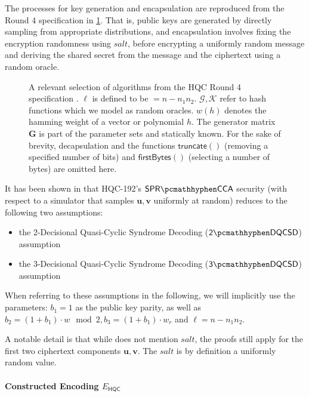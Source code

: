 The processes for key generation and encapsulation are reproduced from the Round 4 specification \cite{NISTPQC-R4:HQC22} in \cref{fig:hqc-spec}. That is, public keys are generated by directly sampling from appropriate distributions, and encapsulation involves fixing the encryption randomness using $\mathit{salt}$, before encrypting a uniformly random message and deriving the shared secret from the message and the ciphertext using a random oracle.

\begin{figure}
    
    \caption[
        A selection of algorithms from the HQC Round 4 specification.
    ]{
        A relevant selection of algorithms from the HQC Round 4 specification \cite{NISTPQC-R4:HQC22}. $\ell$ is defined to be $=n-n_1n_2$. $\mathcal G, \mathcal K$ refer to hash functions which we model as random oracles. $w(h)$ denotes the hamming weight of a vector or polynomial $h$. The generator matrix $\mathbf G$ is part of the parameter sets and statically known.
        For the sake of brevity, decapsulation and the functions $\mathsf{truncate}()$ (removing a specified number of bits) and $\mathsf{firstBytes}()$ (selecting a number of bytes) are omitted here.}
    \label{fig:hqc-spec}
\end{figure}

It has been shown in \cite[Lemma~P.2, Theorem~P.1]{EC:Xagawa22} that HQC-192's $\sprcca$ security (with respect to a simulator that samples $\mathbf u,\mathbf v$ uniformly at random) reduces to the following two assumptions:
\begin{itemize}
    \item the 2-Decisional Quasi-Cyclic Syndrome Decoding ($\twodqcsd$) assumption \cite[Definition~2.1.15]{NISTPQC-R4:HQC22}
    \item the 3-Decisional Quasi-Cyclic Syndrome Decoding ($\threedqcsd$) assumption \cite[Definition~2.1.17]{NISTPQC-R4:HQC22}
\end{itemize}
When referring to these assumptions in the following, we will implicitly use the parameters: $b_1 = 1$ as the public key parity, as well as $b_2 = (1 + b_1) \cdot w \mod 2, b_3 = (1+b_1) \cdot w_r$ and $\ell = n - n_1n_2$.

A notable detail is that while \cite{EC:Xagawa22} does not mention $\mathit{salt}$, the proofs still apply for the first two ciphertext components $\mathbf u, \mathbf v$. The $\mathit{salt}$ is by definition a uniformly random value.

\paragraph{Constructed Encoding $E_\mathsf{HQC}$}

